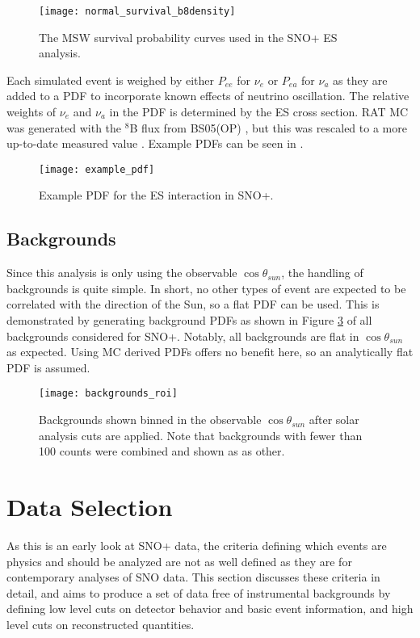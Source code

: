 \begin{figure}
\centering
\texttt{[image: normal\_survival\_b8density]}
\caption{The MSW survival probability curves used in the SNO+ ES analysis.}
\label{fig:solar:msw}
\end{figure}

Each simulated event is weighed by either $P_{ee}$ for $\nu_e$ or $P_{ea}$ for $\nu_a$ as they are added to a PDF to incorporate known effects of neutrino oscillation.
The relative weights of $\nu_e$ and $\nu_a$ in the PDF is determined by the ES cross section.
RAT MC was generated with the $^8$B flux from BS05(OP) \cite{bs05op}, but this was rescaled to a more up-to-date measured value \cite{GlobalSolarFlux}.
Example PDFs can be seen in .

\begin{figure}
\centering
\texttt{[image: example\_pdf]}
\caption{Example PDF for the ES interaction in SNO+.}
\label{fig:solar:pdfs}
\end{figure}

\subsection{Backgrounds}

Since this analysis is only using the observable $\cos{\theta_{sun}}$, the handling of backgrounds is quite simple.
In short, no other types of event are expected to be correlated with the direction of the Sun, so a flat PDF can be used.
This is demonstrated by generating background PDFs as shown in Figure \ref{fig:solar:backgrounds} of all backgrounds considered for SNO+.
Notably, all backgrounds are flat in $\cos{\theta_{sun}}$ as expected.
Using MC derived PDFs offers no benefit here, so an analytically flat PDF is assumed.

\begin{figure}
\centering
\texttt{[image: backgrounds\_roi]}
\caption{Backgrounds shown binned in the observable $\cos{\theta_{sun}}$ after solar analysis cuts are applied.
Note that backgrounds with fewer than 100 counts were combined and shown as as other.}
\label{fig:solar:backgrounds}
\end{figure}

\section{Data Selection}

As this is an early look at SNO+ data, the criteria defining which events are physics and should be analyzed are not as well defined as they are for contemporary analyses of SNO data.
This section discusses these criteria in detail, and aims to produce a set of data free of instrumental backgrounds by defining low level cuts on detector behavior and basic event information, and high level cuts on reconstructed quantities.

